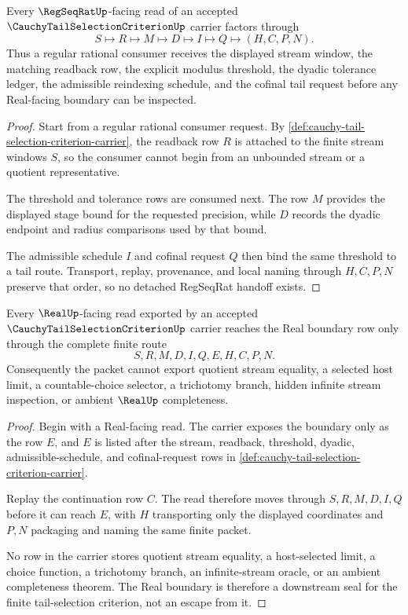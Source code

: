 \begin{theorem}
\label{thm:cauchy-tail-selection-criterion-regseqrat-handoff}
Every $\RegSeqRatUp$-facing read of an accepted $\CauchyTailSelectionCriterionUp$ carrier factors through
$$
S\longmapsto R\longmapsto M\longmapsto D\longmapsto I\longmapsto Q\longmapsto(H,C,P,N).
$$
Thus a regular rational consumer receives the displayed stream window, the matching readback row, the explicit modulus threshold, the dyadic tolerance ledger, the admissible reindexing schedule, and the cofinal tail request before any Real-facing boundary can be inspected.
\end{theorem}
\begin{proof}
Start from a regular rational consumer request. By \autoref{def:cauchy-tail-selection-criterion-carrier}, the readback row $R$ is attached to the finite stream windows $S$, so the consumer cannot begin from an unbounded stream or a quotient representative.

The threshold and tolerance rows are consumed next. The row $M$ provides the displayed stage bound for the requested precision, while $D$ records the dyadic endpoint and radius comparisons used by that bound.

The admissible schedule $I$ and cofinal request $Q$ then bind the same threshold to a tail route. Transport, replay, provenance, and local naming through $H,C,P,N$ preserve that order, so no detached RegSeqRat handoff exists.
\end{proof}

\begin{theorem}
\label{thm:cauchy-tail-selection-criterion-real-boundary}
Every $\RealUp$-facing read exported by an accepted $\CauchyTailSelectionCriterionUp$ carrier reaches the Real boundary row only through the complete finite route
$$
S,R,M,D,I,Q,E,H,C,P,N.
$$
Consequently the packet cannot export quotient stream equality, a selected host limit, a countable-choice selector, a trichotomy branch, hidden infinite stream inspection, or ambient $\RealUp$ completeness.
\end{theorem}
\begin{proof}
Begin with a Real-facing read. The carrier exposes the boundary only as the row $E$, and $E$ is listed after the stream, readback, threshold, dyadic, admissible-schedule, and cofinal-request rows in \autoref{def:cauchy-tail-selection-criterion-carrier}.

Replay the continuation row $C$. The read therefore moves through $S,R,M,D,I,Q$ before it can reach $E$, with $H$ transporting only the displayed coordinates and $P,N$ packaging and naming the same finite packet.

No row in the carrier stores quotient stream equality, a host-selected limit, a choice function, a trichotomy branch, an infinite-stream oracle, or an ambient completeness theorem. The Real boundary is therefore a downstream seal for the finite tail-selection criterion, not an escape from it.
\end{proof}

